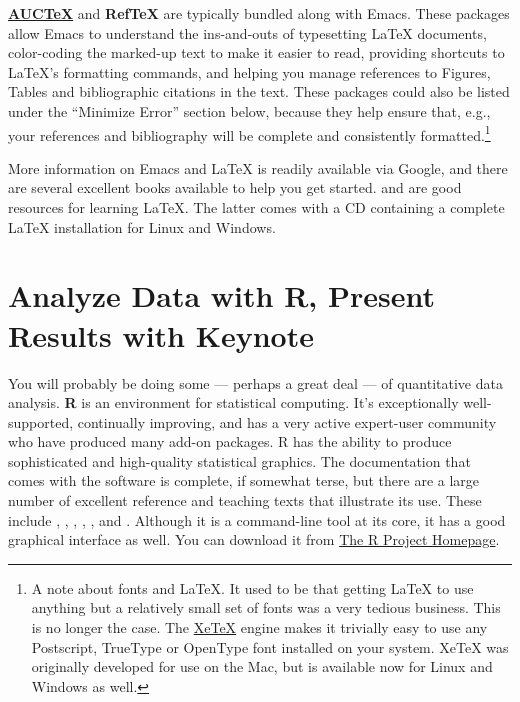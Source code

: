 \documentclass[11pt,article,oneside]{memoir}
\begin{document}
\textbf{\href{http://www.gnu.org/software/auctex/}{AUCTeX}} and \textbf{RefTeX} are typically bundled along with Emacs. These packages allow Emacs to understand the ins-and-outs of typesetting LaTeX documents, color-coding the marked-up text to make it easier to read, providing shortcuts to LaTeX's formatting commands, and helping you manage references to Figures, Tables and bibliographic citations in the text. These packages could also be listed under the ``Minimize Error'' section below, because they help ensure that, e.g., your references and bibliography will be complete and consistently formatted.\footnote{A note about fonts and LaTeX. It used to be that getting LaTeX to use anything but a relatively small set of fonts was a very tedious business. This is no longer the case. The \href{http://scripts.sil.org/cms/scripts/page.php?site_id=nrsi&id=xetex}{XeTeX} engine makes it trivially easy to use any Postscript, TrueType or OpenType font installed on your system. XeTeX was originally developed for use on the Mac, but is available now for Linux and Windows as well.} 

More information on Emacs and LaTeX is readily available via Google, and there are several excellent books available to help you get started. \citet{kopka03:_guide_latex} and \citet{mittlebach04:_latex_compan} are good resources for learning LaTeX. The latter comes with a CD containing a complete LaTeX installation for Linux and Windows. 
     
\section{Analyze Data with R, Present Results with Keynote} 
You will probably be doing some --- perhaps a great deal --- of quantitative data analysis. \textbf{R} is an environment for statistical computing. It's exceptionally well-supported, continually improving, and has a very active expert-user community who have produced many add-on packages. R has the ability to produce sophisticated and high-quality statistical graphics. The documentation that comes with the software is complete, if somewhat terse, but there are a large number of excellent reference and teaching texts that illustrate its use. These include \citet{dalgaard02:_introd_statis_r}, \citet{venables02:_moder_applied_statis_s_plus}, \citet{maindonald03:_data_analy_graph_using_r}, \citet{fox02:_r_s_plus_compan_applied_regres}, \citet{frank01:_regres_model_strat}, and 
\citet{gelmanhill07:data_analysis}. Although it is a command-line tool at its core, it has a good graphical interface as well. You can download it from \href{http://www.r-project.org/}{The R Project Homepage}.     
\end{document}
